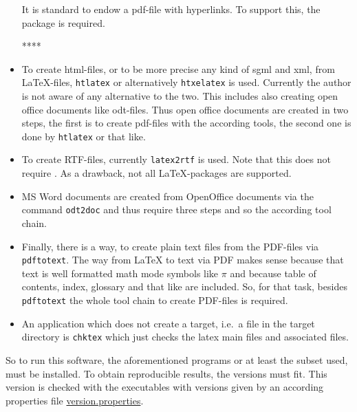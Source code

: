 \begin{itemize}
It is standard to endow a pdf-file with hyperlinks. 
To support this, the package  is required. 

****
\item
To create \gls{html}-files, 
or to be more precise any kind of \gls{sgml} and \gls{xml}, 
from \LaTeX-files, \texttt{htlatex} or alternatively \texttt{htxelatex} is used. 
Currently the author is not aware of any alternative to the two. 
This includes also creating open office documents like odt-files. 
Thus open office documents are created in two steps, 
the first is to create pdf-files with the according tools, 
the second one is done by \texttt{htlatex} or that like. 
\item
To create RTF-files, currently \texttt{latex2rtf} is used. 
Note that this does not require \pdflatex. 
As a drawback, not all \LaTeX-packages are supported. 
\item
MS Word documents are created from OpenOffice documents 
via the command \texttt{odt2doc}  and thus require three steps 
and so the according tool chain. 
\item
Finally, there is a way, to create plain text files from the PDF-files 
via \texttt{pdftotext}. 
The way from \LaTeX{} to text via PDF makes sense 
because that text is well formatted math mode symbols like $\pi$ 
and because table of contents, index, glossary and that like are included. 
So, for that task, besides \texttt{pdftotext} the whole tool chain to create
PDF-files is required. 
\item
An application which does not create a target, 
i.e.~a file in the target directory is \texttt{chktex} 
which just checks the latex main files and associated files. 
\end{itemize}

So to run this software, the aforementioned programs 
or at least the subset used, must be installed.
To obtain reproducible results, the versions must fit.
This version is checked with the executables with versions given by 
an according properties file 
\href{\urlSite fromMain/version.properties}{version.properties}. 



